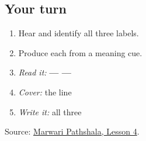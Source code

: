 \subsection*{Your turn}
\begin{enumerate}
\raggedright
  \item Hear and identify all three labels.
  \item Produce each from a meaning cue.
  \item \emph{Read it:} \textbf{ —  — }
  \item \emph{Cover:} the line
  \item \emph{Write it:} all three
\end{enumerate}

\begin{tcolorbox}[breakable,colback=teal!4,colframe=teal!35!black,title={Before you move on}]
Source: \href{https://www.marwaripathshala.com/marwari-lesson-4-english}{Marwari Pathshala, Lesson 4}.
\end{tcolorbox}
